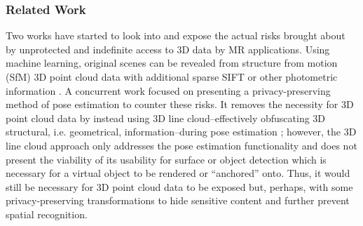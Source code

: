 
\subsubsection*{Related Work}%
Two works have started to look into and expose the actual risks brought about by unprotected and indefinite access to 3D data by MR applications. Using machine learning, original scenes can be revealed from structure from motion (SfM) 3D point cloud data with additional sparse SIFT or other photometric information \cite{pittaluga2019revealing}. A concurrent work focused on presenting a privacy-preserving method of pose estimation to counter these risks. It removes the necessity for 3D point cloud data by instead using 3D line cloud--effectively obfuscating 3D structural, i.e. geometrical, information--during pose estimation \cite{speciale2019privacy}; however, the 3D line cloud approach only addresses the pose estimation functionality and does not present the viability of its usability for surface or object detection which is necessary for a virtual object to be rendered or ``anchored'' onto. Thus, it would still be necessary for 3D point cloud data to be exposed but, perhaps, with some privacy-preserving transformations to hide sensitive content and further prevent spatial recognition. %

